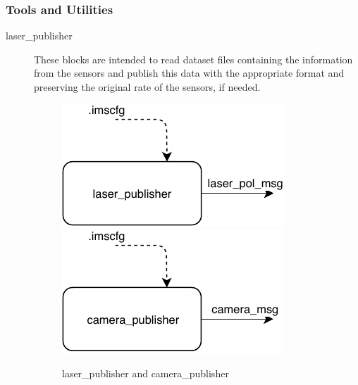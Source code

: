 \subsubsection{Tools and Utilities}
\begin{description}

\item[laser\_publisher] \hfill

These blocks are intended to read dataset files containing the information from the sensors and publish this data with the appropriate format and preserving the original rate of the sensors, if needed.

\begin{figure}[ht!]
\centering
\includegraphics[scale=1]{fig/3/laser_publisher.pdf}
\includegraphics[scale=1]{fig/3/camera_publisher.pdf}
\caption{laser\_publisher and camera\_publisher}
\label{sensors_publishers}
\end{figure}






\end{description}
